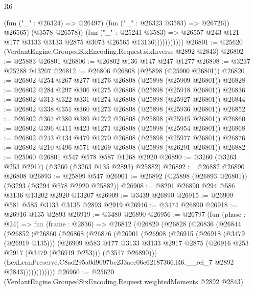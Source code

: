 \begin{lexlean}{R6}
\begin{coremodule}
                              (fun ("_" : @26324) => @26497)
                              (fun ("_" : @26323 @3583) => @26726))
                            @26565)
                          (@3578 @26578))
                        (fun ("_" : @25241 @3583) =>
                        @26557 @243 @121 @177 @3133 @3133 @2875 @3073 @26565 @13136)))))))))))
@26801 := @25620 (VerdantEngine.GroupedSixEncoding.Request.sixInverse @2892 @2843)
@26802 := @25883 @26801
@26806 := @26802 @136 @147 @247 @1277
@26808 := @3237 @25288 @13207
@26812 := @26806 @26808 (@25898 (@25900 @26801))
@26820 := @26802 @254 @267 @277 @1276 @26808 (@25898 (@25909 @26801))
@26828 := @26802 @284 @297 @306 @1275 @26808 (@25898 (@25918 @26801))
@26836 := @26802 @313 @322 @331 @1274 @26808 (@25898 (@25927 @26801))
@26844 := @26802 @338 @351 @360 @1273 @26808 (@25898 (@25936 @26801))
@26852 := @26802 @367 @380 @389 @1272 @26808 (@25898 (@25945 @26801))
@26860 := @26802 @396 @411 @423 @1271 @26808 (@25898 (@25954 @26801))
@26868 := @26802 @243 @434 @479 @1270 @26808 (@25898 (@25977 @26801))
@26876 := @26802 @210 @496 @571 @1269 @26808 (@25898 (@26291 @26801))
@26882 := @25960 @26801 @547 @578 @587 @1268 @2920
@26890 := @3260 (@3263 @253 @2917) (@3260 (@3263 @135 @2893) @25882)
@26892 := @26882 @26890 @26808
@26893 := @25899 @547
@26901 := @26892 (@25898 (@26893 @26801)) (@3293 (@3294 @578 @2920 @25882))
@26908 := @8291 @26890 @294 @586 @3136 @13202 @2920 @13207
@26909 := @3439 @26890
@26915 := @26909 @581 @585 @3133 @3135 @2893 @2919
@26916 := @3474 @26890
@26918 := @26916 @135 @2893
@26919 := @3480 @26890
@26956 := @26797
    (fun (phase : @24) =>
    fun (frame : @2836) =>
    @26812
      (@26820
        (@26828
          (@26836
            (@26844
              (@26852
                (@26860
                  (@26868
                    (@26876
                      (@26901
                        (@26908
                          (@26915
                            (@26918 (@3479 (@26919 @135)))
                            (@26909
                              @583
                              @177
                              @3133
                              @3133
                              @2917
                              @2875
                              (@26916 @253 @2917 (@3479 (@26919 @253)))
                              (@3517 @26890)))
                          (LexLeanPreserve.C8ad295a0d9097be233aee06c62187366.R6.__rel_7
                            @2892
                            @2843))))))))))))
@26960 := @25620 (VerdantEngine.GroupedSixEncoding.Request.weightedMoments @2892 @2843)

\end{coremodule}
\end{lexlean}
